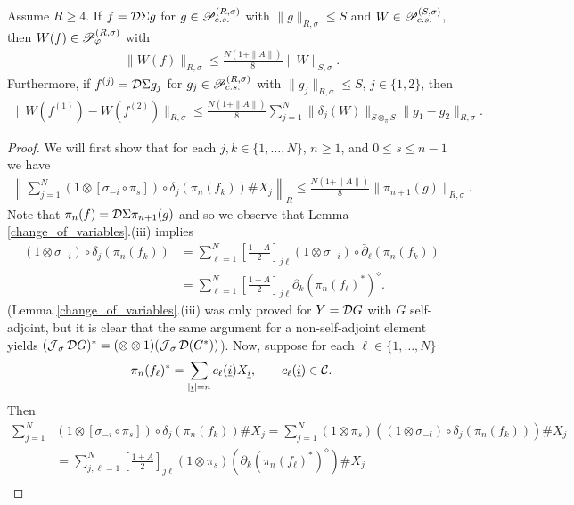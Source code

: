 \begin{lem}\label{W_patchwork}
Assume $R\geq 4$. If $f=\D\Sigma g$ for $g\in \P_{c.s.}^{(R,\sigma)}$ with $\|g\|_{R,\sigma}\leq S$ and $W\in \P_{c.s.}^{(S,\sigma)}$, then $W(f)\in \P_\varphi^{(R,\sigma)}$ with
	\begin{align*}
		\| W(f)\|_{R,\sigma} \leq \frac{N(1+\|A\|)}{8} \|W\|_{S,\sigma}.
	\end{align*}
Furthermore, if $f^{(j)}=\D\Sigma g_j$ for $g_j\in \P_{c.s.}^{(R,\sigma)}$ with $\|g_j\|_{R,\sigma}\leq S$, $j\in\{1,2\}$, then
	\begin{align*}
		\|W(f^{(1)}) - W(f^{(2)})\|_{R,\sigma} \leq \frac{N(1+\|A\|)}{8} \sum_{j=1}^N \|\delta_j(W)\|_{S\otimes_\pi S} \|g_1 - g_2\|_{R,\sigma}.
	\end{align*}
\end{lem}
\begin{proof}
We will first show that for each $j,k\in\{1,\ldots, N\}$, $n\geq 1$, and $0\leq s\leq n-1$ we have
	\begin{align*}
		\left\|\sum_{j=1}^N (1\otimes[\sigma_{-i}\circ\pi_s])\circ\delta_j(\pi_n(f_k))\# X_j\right\|_R \leq \frac{N(1+\|A\|)}{8}\|\pi_{n+1}(g)\|_{R,\sigma}.
	\end{align*}
Note that $\pi_n(f)=\D\Sigma \pi_{n+1}(g)$ and so we observe that Lemma \ref{change_of_variables}.(iii) implies
	\begin{align*}
		(1\otimes\sigma_{-i})\circ\delta_j(\pi_n(f_k)) &= \sum_{\ell=1}^N \left[\frac{1+A}{2}\right]_{j\ell} (1\otimes\sigma_{-i})\circ \bar{\partial}_\ell(\pi_n(f_k))\\
			&= \sum_{\ell=1}^N \left[\frac{1+A}{2}\right]_{j\ell} \partial_k(\pi_n(f_\ell)^*)^\diamond.
	\end{align*}
(Lemma \ref{change_of_variables}.(iii) was only proved for $Y=\D G$ with $G$ self-adjoint, but it is clear that the same argument for a non-self-adjoint element yields $(\J_\sigma \D G)^* = (\otimes\otimes 1)(\J_\sigma \D (G^*))$). Now, suppose for each $\ell\in\{1,\ldots,N\}$
	\begin{align*}
		\pi_n(f_\ell)^* = \sum_{|\ul{i}|=n} c_\ell(\ul{i}) X_{\ul{i}},\qquad c_\ell(\ul{i})\in \C.
	\end{align*}
Then
	\begin{align*}
		\sum_{j=1}^N &(1\otimes[\sigma_{-i}\circ\pi_s])\circ\delta_j(\pi_n(f_k))\# X_j = \sum_{j=1}^N (1\otimes\pi_s)\left( (1\otimes\sigma_{-i})\circ\delta_j(\pi_n(f_k))\right) \# X_j\\
			&=\sum_{j,\ell=1}^N \left[\frac{1+A}{2}\right]_{j\ell} (1\otimes \pi_s)\left( \partial_k(\pi_n(f_\ell)^*)^\diamond\right)\# X_j\\

\end{align*}
\end{proof}
